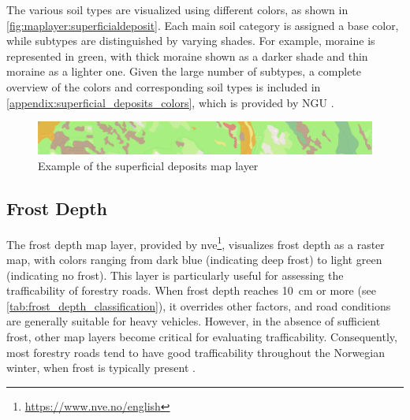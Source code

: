The various soil types are visualized using different colors, as shown in \autoref{fig:maplayer:superficialdeposit}. Each main soil category is assigned a base color, while subtypes are distinguished by varying shades. For example, moraine is represented in green, with thick moraine shown as a darker shade and thin moraine as a lighter one. Given the large number of subtypes, a complete overview of the colors and corresponding soil types is included in \autoref{appendix:superficial_deposits_colors}, which is provided by NGU \cite{ngu_løsmasser_tegneregler}.

\begin{figure}[h]
    \centering
    \includegraphics[width=1\linewidth]{images/maplayers/superficialdeposits.png}
    \caption{Example of the superficial deposits map layer}
    \label{fig:maplayer:superficialdeposit}
\end{figure}

\subsection{Frost Depth}\label{subsec:frostdepth}

The frost depth map layer, provided by \acrfull{nve}\footnote{\url{https://www.nve.no/english}}, visualizes frost depth as a raster map, with colors ranging from dark blue (indicating deep frost) to light green (indicating no frost). This layer is particularly useful for assessing the trafficability of forestry roads. When frost depth reaches \qty{10}{\centi\meter} or more (see \autoref{tab:frost_depth_classification}), it overrides other factors, and road conditions are generally suitable for heavy vehicles. However, in the absence of sufficient frost, other map layers become critical for evaluating trafficability. Consequently, most forestry roads tend to have good trafficability throughout the Norwegian winter, when frost is typically present \cite{wiki:tele}.

